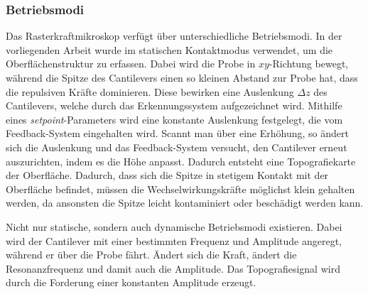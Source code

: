 \subsubsection{Betriebsmodi}
Das Rasterkraftmikroskop verfügt über unterschiedliche Betriebsmodi.
In der vorliegenden Arbeit wurde im statischen Kontaktmodus verwendet, um die Oberflächenstruktur zu erfassen.
Dabei wird die Probe in $xy$-Richtung bewegt, während die Spitze des Cantilevers einen so kleinen Abstand zur Probe hat,
dass die repulsiven Kräfte dominieren.
Diese bewirken eine Auslenkung $\Delta z$ des Cantilevers, welche durch das Erkennungssystem aufgezeichnet wird.
Mithilfe eines \textit{setpoint}-Parameters wird eine konstante Auslenkung festgelegt, die vom Feedback-System
eingehalten wird.
Scannt man über eine Erhöhung, so ändert sich die Auslenkung und das Feedback-System versucht, den Cantilever erneut
auszurichten, indem es die Höhe anpasst.
Dadurch entsteht eine Topografiekarte der Oberfläche.
Dadurch, dass sich die Spitze in stetigem Kontakt mit der Oberfläche befindet, müssen die Wechselwirkungskräfte
möglichst klein gehalten werden,
da ansonsten die Spitze leicht kontaminiert oder beschädigt werden kann.\autocite[199-201]{afm-buch}

Nicht nur statische, sondern auch dynamische Betriebsmodi existieren.
Dabei wird der Cantilever mit einer bestimmten Frequenz und Amplitude angeregt, während er über die Probe fährt.
Ändert sich die Kraft, ändert die Resonanzfrequenz und damit auch die Amplitude.
Das Topografiesignal wird durch die Forderung einer konstanten Amplitude erzeugt.\autocite[209]{afm-buch}





